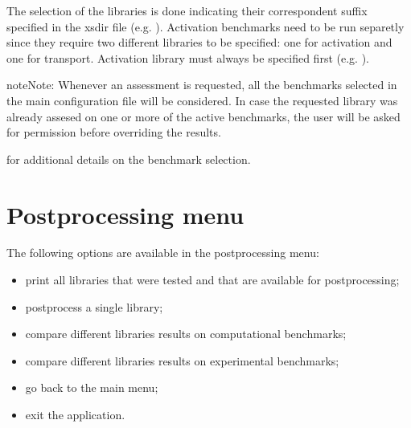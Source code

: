 \documentclass[letterpaper,10pt,english]{sphinxmanual}
\let\sphinxpxdimen\pdfpxdimen\else\newdimen\sphinxpxdimen
\begin{document}
\sphinxAtStartPar
The selection of the libraries is done indicating their correspondent suffix specified in the xsdir file
(e.g. ). Activation benchmarks need to be run separetly since they require two different libraries
to be specified: one for activation and one for transport. Activation library must always be specified
first (e.g. ).

\begin{sphinxadmonition}{note}{Note:}
\sphinxAtStartPar
Whenever an assessment is requested, all the benchmarks selected in the main configuration file will be considered.
In case the requested library was already assesed on one or more of the active benchmarks,
the user will be asked for permission before overriding the results.
\end{sphinxadmonition}


\nopagebreak


\sphinxAtStartPar
{\hyperref[\detokenize{usage/configuration:config}]{}} for additional details on the benchmark selection.




\section{Post\sphinxhyphen{}processing menu}
\label{\detokenize{usage/menu:post-processing-menu}}\label{\detokenize{usage/menu:postmenu}}
\noindent\sphinxincludegraphics[width=400\sphinxpxdimen]{{postmenu}.png}

\sphinxAtStartPar
The following options are available in the post\sphinxhyphen{}processing menu:
\begin{itemize}
\item {} 
\sphinxAtStartPar
{} print all libraries that were tested and that are available for post\sphinxhyphen{}processing;

\item {} 
\sphinxAtStartPar
{} post\sphinxhyphen{}process a single library;

\item {} 
\sphinxAtStartPar
{} compare different libraries results on computational benchmarks;

\item {} 
\sphinxAtStartPar
{} compare different libraries results on experimental benchmarks;

\item {} 
\sphinxAtStartPar
{} go back to the main menu;

\item {} 
\sphinxAtStartPar
{} exit the application.

\end{itemize}
\end{document}
